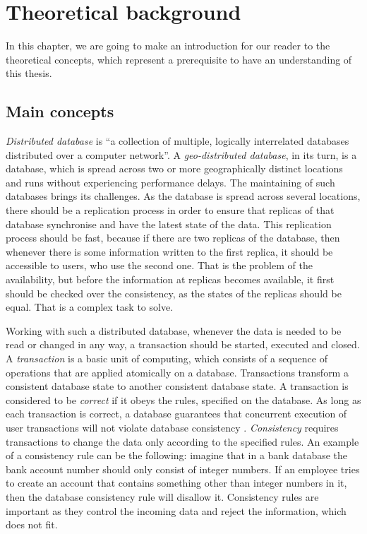 \chapter{Theoretical background}
\label{Background}

In this chapter, we are going to make an introduction for our reader to the theoretical concepts, which represent a prerequisite to have an understanding of this thesis.

\section{Main concepts}
\label{Background-Main}

\textit{Distributed database} is ``a collection of multiple, logically interrelated databases distributed over a computer network''\cite{11}. A \textit{geo-distributed database}, in its turn, is a database, which is spread across two or more geographically distinct locations and runs without experiencing performance delays. The maintaining of such databases brings its challenges. As the database is spread across several locations, there should be a replication process in order to ensure that replicas of that database synchronise and have the latest state of the data. This replication process should be fast, because if there are two replicas of the database, then whenever there is some information written to the first replica, it should be accessible to users, who use the second one. That is the problem of the availability, but before the information at replicas becomes available, it first should be checked over the consistency, as the states of the replicas should be equal. That is a complex task to solve. 

Working with such a distributed database, whenever the data is needed to be read or changed in any way, a transaction should be started, executed and closed. A \textit{transaction} is a basic unit of computing, which consists of a sequence of operations that are applied atomically on a database. Transactions transform a consistent database state to another consistent database state. A transaction is considered to be \textit{correct} if it obeys the rules, specified on the database. As long as each transaction is correct, a database guarantees that concurrent execution of user transactions will not violate database consistency \cite{11}. \textit{Consistency} requires transactions to change the data only according to the specified rules. An example of a consistency rule can be the following: imagine that in a bank database the bank account number should only consist of integer numbers. If an employee tries to create an account that contains something other than integer numbers in it, then the database consistency rule will disallow it. Consistency rules are important as they control the incoming data and reject the information, which does not fit.

